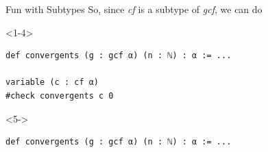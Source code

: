 \documentclass{beamer}
\begin{document}
\begin{frame}[fragile]{Fun with Subtypes}
So, since \emph{cf} is a subtype of \emph{gcf}, we can do
\begin{onlyenv}<1-4>
\begin{verbatim}
def convergents (g : gcf α) (n : ℕ) : α := ...

variable (c : cf α)
#check convergents c 0
\end{verbatim}
\end{onlyenv}
\begin{onlyenv}<5->
\begin{verbatim}
def convergents (g : gcf α) (n : ℕ) : α := ...


\end{verbatim}
\end{onlyenv}
\end{frame}
\end{document}
